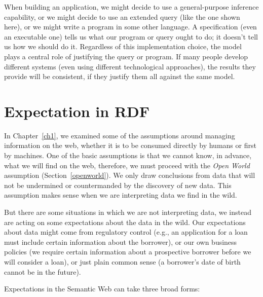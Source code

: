 When building an application, we might decide to use a general-purpose
inference capability, or we might decide to use an extended query (like
the one shown here), or we might write a program in some other language.
A specification (even an executable one) tells us what our program or
query ought to do; it doesn't tell us how we should do it. Regardless of
this implementation choice, the model plays a central role of justifying
the query or program. If many people develop different systems (even
using different technological approaches), the results they provide will
be consistent, if they justify them all against the same model.


\section{Expectation in RDF}


In Chapter~\ref{ch1}, we examined some of the assumptions around managing information on the web, 
whether it is to be consumed directly by humans or first by machines.  One of the basic assumptions is
that we cannot know, in advance, what we will find on the web, therefore, we must proceed with the \emph{Open World} assumption (Section~\ref{openworld}).  We only draw conclusions from data that will not be undermined or countermanded by the discovery of new data.  This assumption makes sense when we are interpreting data we find in the wild.

But there are some situations in which we are not interpreting data, we instead are acting on some expectations about the
data in the wild.  Our expectations about data might come from regulatory control (e.g., an application for a loan must
include certain information about the borrower), or our own business policies (we require certain information about a
prospective borrower before we will consider a loan), or just plain common sense (a borrower's date of birth cannot be in
the future).

Expectations in the Semantic Web can take three broad forms:

